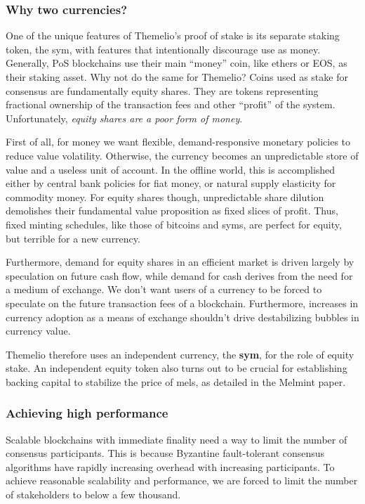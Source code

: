 \documentclass[headinclude,12pt]{scrbook}
\begin{document}
\subsubsection{Why two currencies?}

One of the unique features of Themelio's proof of stake is its separate
staking token, the sym, with features that intentionally discourage use
as money. Generally, PoS blockchains use their main ``money'' coin, like
ethers or EOS, as their staking asset. Why not do the same for Themelio?
Coins used as stake for consensus are fundamentally equity shares. They
are tokens representing fractional ownership of the transaction fees and
other ``profit'' of the system. Unfortunately, \emph{equity shares are a
    poor form of money}.

First of all, for money we want flexible, demand-responsive monetary
policies to reduce value volatility. Otherwise, the currency becomes an
unpredictable store of value and a useless unit of account. In the
offline world, this is accomplished either by central bank policies for
fiat money, or natural supply elasticity for commodity money. For equity
shares though, unpredictable share dilution demolishes their fundamental
value proposition as fixed slices of profit. Thus, fixed minting
schedules, like those of bitcoins and syms, are perfect for equity, but
terrible for a new currency.

Furthermore, demand for equity shares in an efficient market is driven
largely by speculation on future cash flow, while demand for cash
derives from the need for a medium of exchange. We don't want users of a
currency to be forced to speculate on the future transaction fees of a
blockchain. Furthermore, increases in currency adoption as a means of
exchange shouldn't drive destabilizing bubbles in currency value.

Themelio therefore uses an independent currency, the \textbf{sym}, for
the role of equity stake. An independent equity token also turns out to
be crucial for establishing backing capital to stabilize the price of
mels, as detailed in the Melmint paper.

\subsubsection{Achieving high performance}

Scalable blockchains with immediate finality need a way to limit the
number of consensus participants. This is because Byzantine
fault-tolerant consensus algorithms have rapidly increasing overhead
with increasing participants. To achieve reasonable scalability and
performance, we are forced to limit the number of stakeholders to below
a few thousand.
\end{document}
